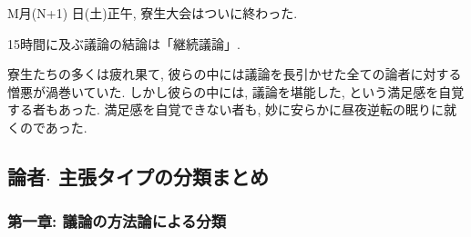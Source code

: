 \documentclass[10pt,b5jsbook,dvips,dvipdfmx,openany]{jsbook}
\theoremstyle{definition}
\begin{document}
		M月(N+1) 日(土)正午, 寮生大会はついに終わった.

		15時間に及ぶ議論の結論は「継続議論」.

		寮生たちの多くは疲れ果て, 彼らの中には議論を長引かせた全ての論者に対する憎悪が渦巻いていた. しかし彼らの中には, 議論を堪能した, という満足感を自覚する者もあった. 満足感を自覚できない者も, 妙に安らかに昼夜逆転の眠りに就くのであった.
		\normalsize

		\subsection{論者$ \cdot $ 主張タイプの分類まとめ}

			\subsubsection{第一章: 議論の方法論による分類}
\end{document}
